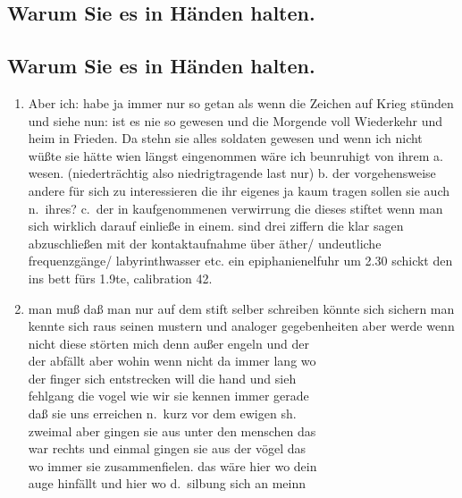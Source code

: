 \documentclass[
]{article}
\author{}
\date{\vspace{-2.5em}}
\providecommand{\tightlist}{%
  \setlength{\itemsep}{0pt}\setlength{\parskip}{0pt}}
\begin{document}
\subsection{Warum Sie es in Händen
halten.}\label{warum-sie-es-in-huxe4nden-halten.}

\subsection{Warum Sie es in Händen
halten.}\label{warum-sie-es-in-huxe4nden-halten.-1}

\begin{enumerate}
\def\labelenumi{\arabic{enumi}.}
\setcounter{enumi}{17}
\tightlist
\item
  Aber ich: habe ja immer nur so getan als wenn die Zeichen auf Krieg
  stünden und siehe nun: ist es nie so gewesen und die Morgende voll
  Wiederkehr und heim in Frieden. Da stehn sie alles soldaten gewesen
  und wenn ich nicht wüßte sie hätte wien längst eingenommen wäre ich
  beunruhigt von ihrem a. wesen. (niederträchtig also niedrigtragende
  last nur) b. der vorgehensweise andere für sich zu interessieren die
  ihr eigenes ja kaum tragen sollen sie auch n.~ihres? c.~der in
  kaufgenommenen verwirrung die dieses stiftet wenn man sich wirklich
  darauf einließe in einem. sind drei ziffern die klar sagen
  abzuschließen mit der kontaktaufnahme über äther/ undeutliche
  frequenzgänge/ labyrinthwasser etc. ein epiphanienelfuhr um 2.30
  schickt den ins bett fürs 1.9te, calibration 42.\\
\item
  man muß daß man nur auf dem stift selber schreiben könnte sich sichern
  man kennte sich raus seinen mustern und analoger gegebenheiten aber
  werde wenn nicht diese störten mich denn außer engeln und der\\
  der abfällt aber wohin wenn nicht da immer lang wo\\
  der finger sich entstrecken will die hand und sieh\\
  fehlgang die vogel wie wir sie kennen immer gerade\\
  daß sie uns erreichen n.~kurz vor dem ewigen sh.\\
  zweimal aber gingen sie aus unter den menschen das\\
  war rechts und einmal gingen sie aus der vögel das\\
  wo immer sie zusammenfielen. das wäre hier wo dein\\
  auge hinfällt und hier wo d.~silbung sich an meinn\\

\end{enumerate}
\end{document}
